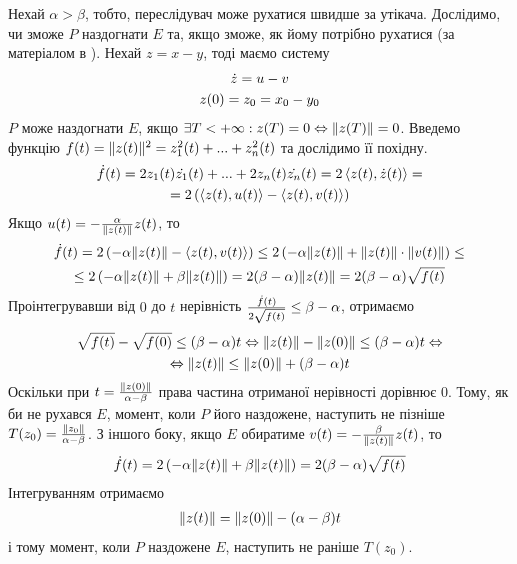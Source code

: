 Нехай $\alpha > \beta$, тобто, переслідувач може рухатися швидше за утікача. Дослідимо,
чи зможе $P$ наздогнати $E$ та, якщо зможе, як йому потрібно рухатися (за матеріалом в \cite{3}).
Нехай $z = x - y$, тоді маємо систему
\begin{gather*}
    \dot{z} = u - v \\
    z(0) = z_0 = x_0 - y_0
\end{gather*}
$P$ може наздогнати $E$, якщо $\exists T < +\infty : z(T) = 0 \Leftrightarrow \Vert z(T) \Vert = 0$.
Введемо функцію $f(t) = \Vert z(t) \Vert^2 = z_1^2(t) + ... + z_n^2(t)$ та дослідимо її похідну.
\begin{gather*}
    \dot{f}(t) = 2 z_1(t) \dot{z_1}(t) +  ... + 2 z_n(t) \dot{z_n}(t) =
    2 \left< z(t), \dot{z}(t)\right> = \\ = 2 \left(\left< z(t), u(t)\right> - \left< z(t), v(t)\right> \right)
\end{gather*}
Якщо $u(t) = - \frac{\alpha}{\Vert z(t) \Vert} z(t)$, то 
\begin{gather*}
    \dot{f}(t) = 2 \left( -\alpha \Vert z(t) \Vert - \left< z(t), v(t)\right>\right) \leq
    2 \left( -\alpha \Vert z(t) \Vert + \Vert z(t) \Vert\cdot \Vert v(t) \Vert\right) \leq \\
    \leq 2 \left( -\alpha \Vert z(t) \Vert + \beta \Vert z(t) \Vert\right) = 2(\beta - \alpha) \Vert z(t) \Vert = 
    2 (\beta - \alpha) \sqrt{f(t)}
\end{gather*}
Проінтегрувавши від $0$ до $t$ нерівність $\frac{\dot{f}(t)}{2\sqrt{f(t)}} \leq \beta - \alpha$,
отримаємо
\begin{gather*}
    \sqrt{f(t)} - \sqrt{f(0)} \leq (\beta - \alpha) t \Leftrightarrow
    \Vert z(t) \Vert - \Vert z(0) \Vert \leq (\beta - \alpha) t \Leftrightarrow \\ \Leftrightarrow
    \Vert z(t) \Vert \leq \Vert z(0) \Vert + (\beta - \alpha) t
\end{gather*}
Оскільки при $t = \frac{\Vert z(0) \Vert}{\alpha - \beta}$ права частина отриманої нерівності дорівнює 0.
Тому, як би не рухався $E$, момент, коли $P$ його наздожене, наступить не пізніше $T(z_0) = \frac{\Vert z_0 \Vert}{\alpha - \beta}$.
З іншого боку, якщо $E$ обиратиме $v(t) = -\frac{\beta}{\Vert z(t) \Vert} z(t)$, то
\begin{gather*}
    \dot{f}(t) = 2 \left(-\alpha \Vert z(t) \Vert + \beta \Vert z(t) \Vert\right) = 2(\beta - \alpha) \sqrt{f(t)}
\end{gather*}
Інтегруванням отримаємо
\begin{gather*}
    \Vert z(t) \Vert = \Vert z(0) \Vert - (\alpha - \beta) t
\end{gather*}
і тому момент, коли $P$ наздожене $E$, наступить не раніше $T(z_0)$.

